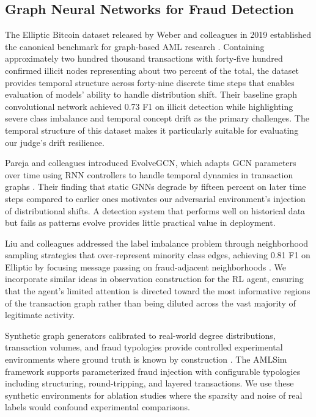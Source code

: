 \documentclass[11pt,a4paper]{article}
\begin{document}
\subsection{Graph Neural Networks for Fraud Detection}

The Elliptic Bitcoin dataset released by Weber and colleagues in 2019 established the canonical benchmark for graph-based AML research \citep{weber2019anti}. Containing approximately two hundred thousand transactions with forty-five hundred confirmed illicit nodes representing about two percent of the total, the dataset provides temporal structure across forty-nine discrete time steps that enables evaluation of models' ability to handle distribution shift. Their baseline graph convolutional network achieved 0.73 F1 on illicit detection while highlighting severe class imbalance and temporal concept drift as the primary challenges. The temporal structure of this dataset makes it particularly suitable for evaluating our judge's drift resilience.

Pareja and colleagues introduced EvolveGCN, which adapts GCN parameters over time using RNN controllers to handle temporal dynamics in transaction graphs \citep{pareja2020evolvegcn}. Their finding that static GNNs degrade by fifteen percent on later time steps compared to earlier ones motivates our adversarial environment's injection of distributional shifts. A detection system that performs well on historical data but fails as patterns evolve provides little practical value in deployment.

Liu and colleagues addressed the label imbalance problem through neighborhood sampling strategies that over-represent minority class edges, achieving 0.81 F1 on Elliptic by focusing message passing on fraud-adjacent neighborhoods \citep{liu2021pick}. We incorporate similar ideas in observation construction for the RL agent, ensuring that the agent's limited attention is directed toward the most informative regions of the transaction graph rather than being diluted across the vast majority of legitimate activity.

Synthetic graph generators calibrated to real-world degree distributions, transaction volumes, and fraud typologies provide controlled experimental environments where ground truth is known by construction \citep{altman2023realistic}. The AMLSim framework supports parameterized fraud injection with configurable typologies including structuring, round-tripping, and layered transactions. We use these synthetic environments for ablation studies where the sparsity and noise of real labels would confound experimental comparisons.
\end{document}

